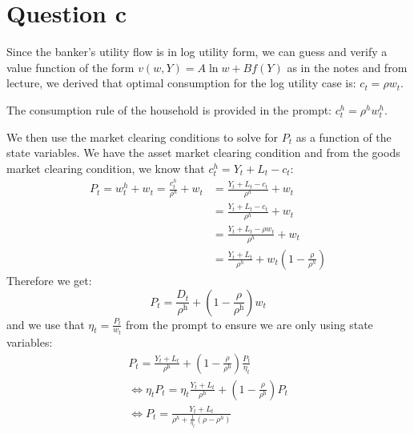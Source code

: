 \documentclass{article}
\begin{document}
\section*{Question c}
Since the banker's utility flow is in log utility form, we can guess and verify a value function of the form $v(w, Y)=A \ln w+B f(Y)$ as in the notes and from lecture, we derived that optimal consumption for the log utility case is: $\boxed{c_{t}=\rho w_{t}}$.

The consumption rule of the household is provided in the prompt: $\boxed{c_t^h = \rho^h w^h_t}$.

We then use the market clearing conditions to solve for $P_t$ as a function of the state variables. We have the asset market clearing condition and from the goods market clearing condition, we know that $c_t^h = Y_t + L_t - c_t$:
\[
\begin{aligned}
    P_t = w_t^h + w_t = \frac{c_t^h}{\rho^h} + w_t &= \frac{Y_t + L_t - c_t}{\rho^h} + w_t\\
    &= \frac{Y_t + L_t - c_t}{\rho^h} + w_t\\
    &= \frac{Y_t + L_t - \rho w_t}{\rho^h} + w_t\\
    &= \frac{Y_t + L_t}{\rho^h} + w_t\left(1 - \frac{\rho}{\rho^h}\right)
\end{aligned}
\]
Therefore we get:
\[
P_{t}=\frac{D_{t}}{\rho^{\mathrm{h}}}+\left(1-\frac{\rho}{\rho^{\mathrm{h}}}\right) w_{t}
\]
and we use that $\eta_t = \frac{P_t}{w_t}$ from the prompt to ensure we are only using state variables:
\[
\begin{aligned}
    P_{t}=\frac{Y_{t} + L_t}{\rho^{\mathrm{h}}}+\left(1-\frac{\rho}{\rho^{\mathrm{h}}}\right) \frac{P_t}{\eta_t}\\
    \iff \eta_t P_t = \eta_t \frac{Y_{t} + L_t}{\rho^{\mathrm{h}}}+\left(1-\frac{\rho}{\rho^{\mathrm{h}}}\right) P_t\\
    \iff \boxed{P_t = \frac{Y_{t} + L_t}{\rho^h + \frac{1}{\eta_t}(\rho-\rho^h)}}
\end{aligned}
\]
\end{document}

